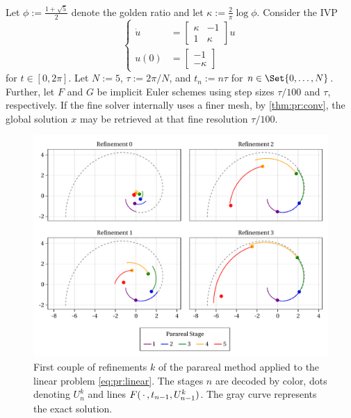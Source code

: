 \begin{example}
  Let $\phi := \frac{1+\sqrt{5}}{2}$ denote the golden ratio and
  let $\kappa := \frac{2}{\pi} \log \phi$.
  Consider the \ac{IVP}
  \begin{equation}
    \label{eq:pr:linear}
    \left\{
    \begin{aligned}
      \dot u &= \begin{bmatrix}
        \kappa & -1 \\
        1 & \kappa
      \end{bmatrix} u \\
      u(0) &= \begin{bmatrix}
        -1 \\ -\kappa
      \end{bmatrix}
    \end{aligned}
    \right.
  \end{equation}
  for $t\in[0,2\pi]$.
  Let $N := 5$, $\tau := 2\pi/N$, and $t_n := n\tau$ for $n\in\Set{0,\ldots,N}$.
  Further, let $F$ and $G$ be implicit Euler schemes using step sizes $\tau/100$ and $\tau$, respectively.
  If the fine solver internally uses a finer mesh,
  by \autoref{thm:pr:conv},
  the global solution $x$ may be retrieved at that fine resolution $\tau/100$.

  \begin{figure}[tb]
    \includegraphics[width=\textwidth]{figures/fig_parareal_example.pdf}
    \caption[Parareal method applied to a linear ODE]{%
      First couple of refinements $k$ of the
      parareal method applied to the linear problem \eqref{eq:pr:linear}.
      The stages $n$ are decoded by color,
      dots denoting $U^k_n$ and lines $F(\optional{}, t_{n-1}, U^k_{n-1})$.
      The gray curve represents the exact solution.
    }
    \label{fig:pr:linear}
  \end{figure}


\end{example}
